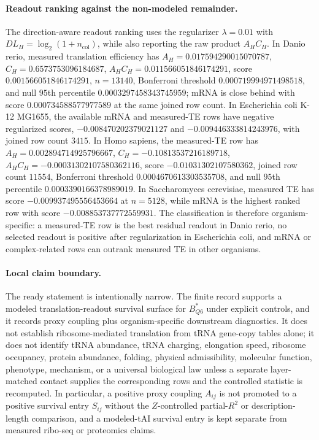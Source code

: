 \paragraph{Readout ranking against the non-modeled remainder.}
The direction-aware readout ranking uses the regularizer $\lambda=0.01$ with $DL_H=\log_2(1+n_{\mathrm{col}})$, while also reporting the raw product $A_H C_H$.  In Danio rerio, measured translation efficiency has $A_H=0.017594290015070787$, $C_H=0.6573753096184687$, $A_HC_H=0.011566051846174291$, score $0.001566051846174291$, $n=13140$, Bonferroni threshold $0.000719994971498518$, and null $95$th percentile $0.0003297458343745959$; mRNA is close behind with score $0.000734588577977589$ at the same joined row count.  In Escherichia coli K-12 MG1655, the available mRNA and measured-TE rows have negative regularized scores, $-0.008470202379021127$ and $-0.009446333814243976$, with joined row count $3415$.  In Homo sapiens, the measured-TE row has $A_H=0.002894714925796667$, $C_H=-0.10813537216189718$, $A_HC_H=-0.00031302107580362116$, score $-0.01031302107580362$, joined row count $11554$, Bonferroni threshold $0.0004670613303535708$, and null $95$th percentile $0.0003390166378989019$.  In Saccharomyces cerevisiae, measured TE has score $-0.009937495556453664$ at $n=5128$, while mRNA is the highest ranked row with score $-0.008853737772559931$.  The classification is therefore organism-specific: a measured-TE row is the best residual readout in Danio rerio, no selected readout is positive after regularization in Escherichia coli, and mRNA or complex-related rows can outrank measured TE in other organisms.

\paragraph{Local claim boundary.}
The ready statement is intentionally narrow.  The finite record supports a modeled translation-readout survival surface for $B^{\ast}_{Q6}$ under explicit controls, and it records proxy coupling plus organism-specific downstream diagnostics.  It does not establish ribosome-mediated translation from tRNA gene-copy tables alone; it does not identify tRNA abundance, tRNA charging, elongation speed, ribosome occupancy, protein abundance, folding, physical admissibility, molecular function, phenotype, mechanism, or a universal biological law unless a separate layer-matched contact supplies the corresponding rows and the controlled statistic is recomputed.  In particular, a positive proxy coupling $A_{ij}$ is not promoted to a positive survival entry $S_{ij}$ without the $Z$-controlled partial-$R^2$ or description-length comparison, and a modeled-tAI survival entry is kept separate from measured ribo-seq or proteomics claims.

